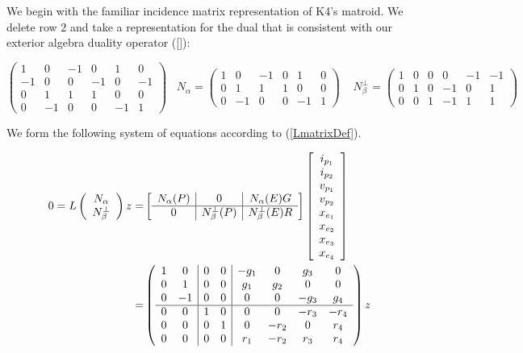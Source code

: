 We begin with the familiar incidence matrix representation of K4's matroid.
We delete row 2 and take a representation for the dual that is consistent
with our exterior algebra duality operator (\ref{}):


\[
\left(\begin{array}{cc|cccc}
1 & 0 & -1 & 0 & 1 & 0 \\
-1 & 0 & 0 & -1 & 0 & -1 \\
0 & 1 & 1 & 1 & 0 & 0 \\
0 & -1 & 0 & 0 & -1 & 1
\end{array}\right)
\;\;\;
N_\alpha=
\left(\begin{array}
{cc|cccc}
1 & 0 & -1 & 0 & 1 & 0 \\
0 & 1 & 1 & 1 & 0 & 0 \\
0 & -1 & 0 & 0 & -1 & 1
\end{array}\right)
\;\;\;\;
N_\beta^\perp =
\left(\begin{array}{cc|cccc}
1 & 0 & 0 & 0 & -1 & -1 \\
0 & 1 & 0 & -1 & 0 & 1 \\
0 & 0 & 1 & -1 & 1 & 1
\end{array}\right)
\]


We form the following system of equations according to (\ref{LmatrixDef}).

\begin{equation}\label{K4Equation}
\begin{split}
  0=L\left(\begin{array}{cc} {\ensuremath{N_{\alpha}}} \\ {N_{\beta}^{\perp}}  \end{array}\right)z
    =& \left[\begin{array}{c|c|c} N_{\alpha}(P)  &  0  &  N_{\alpha}(E)G \\  \hline
        0  & N_{\beta}^{\perp}(P)  &  N_{\beta}^{\perp}(E)R \end{array}\right]
    \left[ \begin{array}{c} i_{p_1} \\ i_{p_2} \\ v_{p_1} \\ v_{p_2} \\ x_{e_1} \\ x_{e_2} \\ x_{e_3} \\ x_{e_4}
      \end{array}
      \right]
    \\
    =&
\left(\begin{array}{cc|cc|cccc}
1 & 0 & 0 & 0 & -g_{1} & 0 & g_{3} & 0 \\
0 & 1 & 0 & 0 & g_{1} & g_{2} & 0 & 0 \\
0 & -1 & 0 & 0 & 0 & 0 & -g_{3} & g_{4} \\ \hline
0 & 0 & 1 & 0 & 0 & 0 & -r_{3} & -r_{4} \\
0 & 0 & 0 & 1 & 0 & -r_{2} & 0 & r_{4} \\
0 & 0 & 0 & 0 & r_{1} & -r_{2} & r_{3} & r_{4}
\end{array}\right)z
\end{split}
\end{equation}


